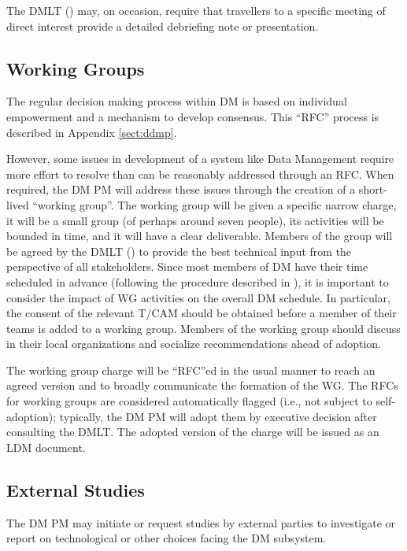 The DMLT () may, on occasion, require that travellers to a specific meeting of direct interest provide a detailed debriefing note or presentation.

\subsection {Working Groups} \label{sect:wgs}

The regular decision making process within DM is based on individual empowerment and a mechanism to develop consensus.
This ``RFC'' process is described in Appendix \ref{sect:ddmp}.

However, some issues in development of a system like Data Management require more effort to resolve than can be reasonably addressed through an RFC.
When required, the DM PM will address these issues through the creation of a short-lived ``working group''.
The working group will be given a specific narrow charge, it will be a small group (of perhaps around seven people), its activities will be bounded in time, and it will have a clear deliverable.
Members of the group will be agreed by the DMLT () to provide the best technical input from the perspective of all stakeholders.
Since most members of DM have their time scheduled in advance (following the procedure described in ), it is important to consider the impact of WG activities on the overall DM schedule.
In particular, the consent of the relevant T/CAM should be obtained before a member of their teams is added to a working group.
Members of the working group should discuss in their local organizations and socialize recommendations ahead of adoption.

The working group charge will be ``RFC''ed in the usual manner to reach an agreed version and to broadly communicate the formation of the WG.
The RFCs for working groups are considered automatically flagged (i.e., not
subject to self-adoption); typically, the DM PM will adopt them by executive
decision after consulting the DMLT.  The adopted version of the charge will be issued as an LDM document.

\subsection {External Studies} \label{sect:studies}

The DM PM may initiate or request studies by external parties to investigate or report on technological or other choices facing the DM subsystem.

